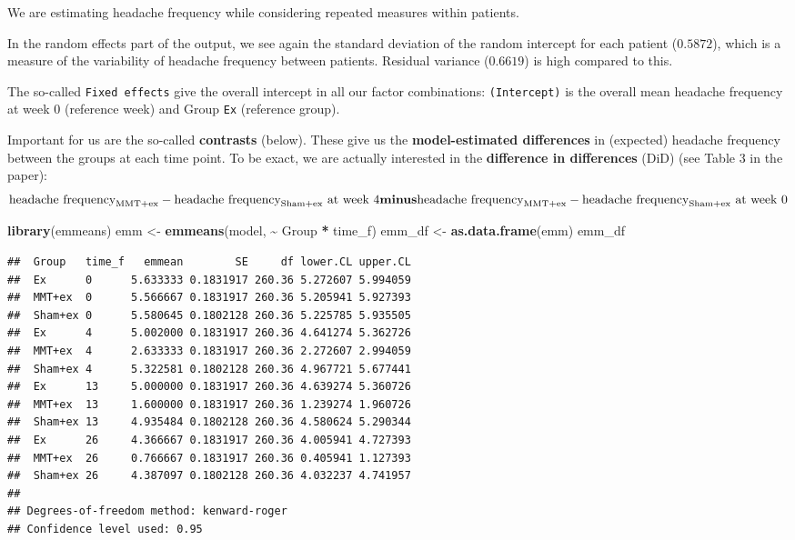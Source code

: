 \documentclass[
]{article}
\newenvironment{Shaded}{\begin{snugshade}}{\end{snugshade}}
\newcommand{\FunctionTok}[1]{\textcolor[rgb]{0.13,0.29,0.53}{\textbf{#1}}}
\newcommand{\NormalTok}[1]{#1}
\newcommand{\OtherTok}[1]{\textcolor[rgb]{0.56,0.35,0.01}{#1}}
\newcommand{\SpecialCharTok}[1]{\textcolor[rgb]{0.81,0.36,0.00}{\textbf{#1}}}
\begin{document}
We are estimating headache frequency while considering repeated measures
within patients.

In the random effects part of the output, we see again the standard
deviation of the random intercept for each patient (\(0.5872\)), which
is a measure of the variability of headache frequency between patients.
Residual variance (\(0.6619\)) is high compared to this.

The so-called \texttt{Fixed\ effects} give the overall intercept in all
our factor combinations: \texttt{(Intercept)} is the overall mean
headache frequency at week \(0\) (reference week) and Group \texttt{Ex}
(reference group).

Important for us are the so-called \textbf{contrasts} (below). These
give us the \textbf{model-estimated differences} in (expected) headache
frequency between the groups at each time point. To be exact, we are
actually interested in the \textbf{difference in differences} (DiD) (see
Table 3 in the paper): \[
\text{headache frequency}_{\text{MMT+ex}} - \text{headache frequency}_{\text{Sham+ex}} \text{ at week } 4 \\
\textbf{minus} \\ 
\text{headache frequency}_{\text{MMT+ex}} - \text{headache frequency}_{\text{Sham+ex}} \text{ at week } 0
\]

\begin{Shaded}
\begin{Highlighting}[]
\FunctionTok{library}\NormalTok{(emmeans)}
\NormalTok{emm }\OtherTok{\textless{}{-}} \FunctionTok{emmeans}\NormalTok{(model, }\SpecialCharTok{\textasciitilde{}}\NormalTok{ Group }\SpecialCharTok{*}\NormalTok{ time\_f)}
\NormalTok{emm\_df }\OtherTok{\textless{}{-}} \FunctionTok{as.data.frame}\NormalTok{(emm)}
\NormalTok{emm\_df}
\end{Highlighting}
\end{Shaded}

\begin{verbatim}
##  Group   time_f   emmean        SE     df lower.CL upper.CL
##  Ex      0      5.633333 0.1831917 260.36 5.272607 5.994059
##  MMT+ex  0      5.566667 0.1831917 260.36 5.205941 5.927393
##  Sham+ex 0      5.580645 0.1802128 260.36 5.225785 5.935505
##  Ex      4      5.002000 0.1831917 260.36 4.641274 5.362726
##  MMT+ex  4      2.633333 0.1831917 260.36 2.272607 2.994059
##  Sham+ex 4      5.322581 0.1802128 260.36 4.967721 5.677441
##  Ex      13     5.000000 0.1831917 260.36 4.639274 5.360726
##  MMT+ex  13     1.600000 0.1831917 260.36 1.239274 1.960726
##  Sham+ex 13     4.935484 0.1802128 260.36 4.580624 5.290344
##  Ex      26     4.366667 0.1831917 260.36 4.005941 4.727393
##  MMT+ex  26     0.766667 0.1831917 260.36 0.405941 1.127393
##  Sham+ex 26     4.387097 0.1802128 260.36 4.032237 4.741957
## 
## Degrees-of-freedom method: kenward-roger 
## Confidence level used: 0.95
\end{verbatim}
\end{document}

